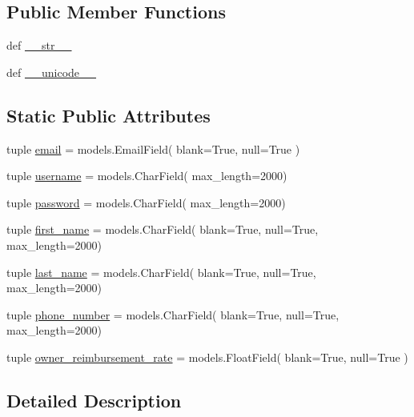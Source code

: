 \subsection*{Public Member Functions}
\begin{DoxyCompactItemize}
\item 
def \hyperlink{classreservation__manager_1_1models_1_1Owner_a685fd99b5f74c00cc8d4ab1617d51b0f}{\-\_\-\-\_\-str\-\_\-\-\_\-}
\item 
def \hyperlink{classreservation__manager_1_1models_1_1Owner_aa5f8a6f5e6225243c4ddb9a7fadb0a27}{\-\_\-\-\_\-unicode\-\_\-\-\_\-}
\end{DoxyCompactItemize}
\subsection*{Static Public Attributes}
\begin{DoxyCompactItemize}
\item 
tuple \hyperlink{classreservation__manager_1_1models_1_1Owner_a590ba8cdf753645e9d8654a361dc724c}{email} = models.\-Email\-Field( blank=True, null=True )
\item 
tuple \hyperlink{classreservation__manager_1_1models_1_1Owner_adf54a9032e66d1d40dc182666797f6c5}{username} = models.\-Char\-Field( max\-\_\-length=2000)
\item 
tuple \hyperlink{classreservation__manager_1_1models_1_1Owner_a9a3598a66af055f662af779e836e9b21}{password} = models.\-Char\-Field( max\-\_\-length=2000)
\item 
tuple \hyperlink{classreservation__manager_1_1models_1_1Owner_ab12cc2e4b6cded5058da43e44f968eb6}{first\-\_\-name} = models.\-Char\-Field( blank=True, null=True, max\-\_\-length=2000)
\item 
tuple \hyperlink{classreservation__manager_1_1models_1_1Owner_a812644470df6789464d7cd461d7692a7}{last\-\_\-name} = models.\-Char\-Field( blank=True, null=True, max\-\_\-length=2000)
\item 
tuple \hyperlink{classreservation__manager_1_1models_1_1Owner_a5dfa25b100a3201b98c9646fcfd7c06c}{phone\-\_\-number} = models.\-Char\-Field( blank=True, null=True, max\-\_\-length=2000)
\item 
tuple \hyperlink{classreservation__manager_1_1models_1_1Owner_a63136fe73cb79c9fb8cae6380af6b666}{owner\-\_\-reimbursement\-\_\-rate} = models.\-Float\-Field( blank=True, null=True )
\end{DoxyCompactItemize}


\subsection{Detailed Description}


